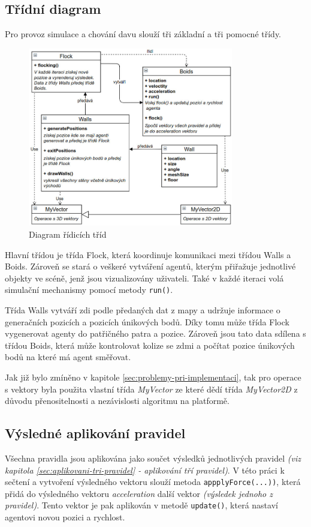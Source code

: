 \documentclass[czech,public,dept460,male,cpdeclaration]{diploma}
\begin{document}
\subsection{Třídní diagram}
Pro provoz simulace a chování davu slouží tři základní a tři pomocné třídy.

\begin{figure}[H]\centering\includegraphics[width=0.8\textwidth]{Figures/diagram2.jpg}
	\caption{Diagram řídicích tříd}
\end{figure}

Hlavní třídou je třída Flock, která koordinuje komunikaci mezi třídou Walls a Boids. Zároveň se stará o veškeré vytváření agentů, kterým přiřažuje jednotlivé objekty ve scéně, jenž jsou vizualizovány uživateli. Také v každé iteraci volá simulační mechanismy pomocí metody \texttt{run()}.

Třída Walls vytváří zdi podle předaných dat z mapy a udržuje informace o generačních pozicích a pozicích únikových bodů. Díky tomu může třída Flock vygenerovat agenty do patřičného patra a pozice. Zároveň jsou tato data sdílena s třídou Boids, která může kontrolovat kolize se zdmi a počítat pozice únikových bodů na které má agent směřovat.

Jak již bylo zmíněno v kapitole \ref{sec:problemy-pri-implementaci}, tak pro operace s vektory byla použita vlastní třída \textit{MyVector} ze které dědí třída \textit{MyVector2D} z důvodu přenositelnosti a nezávislosti algoritmu na platformě.

\subsection{Výsledné aplikování pravidel}
Všechna pravidla jsou aplikována jako součet výsledků jednotlivých pravidel \textit{(viz kapitola \ref{sec:aplikovani-tri-pravidel} - aplikování tří pravidel)}. V této práci k sečtení a vytvoření výsledného vektoru slouží metoda \texttt{appplyForce(...))}, která přidá do výsledného vektoru \textit{acceleration} další vektor \textit{(výsledek jednoho z pravidel)}. Tento vektor je pak aplikován v metodě \texttt{update()}, která nastaví agentovi novou pozici a rychlost.
\end{document}

